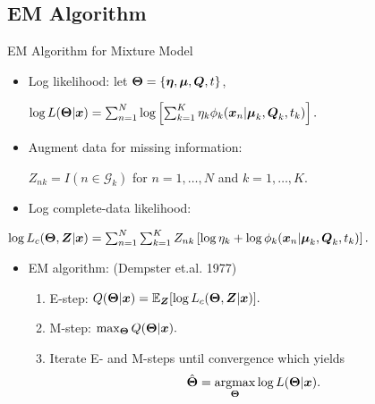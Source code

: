 \documentclass{beamer}
\begin{document}

\subsection{EM Algorithm}

\begin{frame}{EM Algorithm for Mixture Model}

\begin{itemize}
\item Log likelihood:
let $\boldsymbol{\Theta} = \{\boldsymbol{\eta}, \boldsymbol{\mu}, \boldsymbol{Q}, t\}$,
\begin{center}
$
\log L(\boldsymbol{\Theta} | \boldsymbol{x})
 = \sum_{n=1}^N \log \left[
   \sum_{k = 1}^K \eta_k \phi_k(\boldsymbol{x}_n| \boldsymbol{\mu}_k, \boldsymbol{Q}_k, t_k)
   \right ].
$
\end{center}


\item Augment data for missing information:
\begin{center}
$Z_{nk} = I(n \in \mathcal{G}_k)$
for $n = 1, \ldots, N$ and $k = 1, \ldots, K$.
\end{center}


\item Log complete-data likelihood:
\end{itemize}
\begin{center}
$
\log L_c(\boldsymbol{\Theta}, \boldsymbol{Z} | \boldsymbol{x}) =
\sum_{n = 1}^N
\sum_{k=1}^K
Z_{nk}
\left[ \log \eta_k + \log \phi_k(\boldsymbol{x}_n| \boldsymbol{\mu}_k, \boldsymbol{Q}_k, t_k)
\right].
$
\end{center}

\begin{itemize}
\item EM algorithm:  (Dempster et.al. 1977)

\begin{enumerate}
\item E-step:
$
Q(\boldsymbol{\Theta} | \boldsymbol{x}) =
\mathbb{E}_{\boldsymbol{Z}} [\log L_c(\boldsymbol{\Theta},\boldsymbol{Z} | \boldsymbol{x})].
$

\item M-step:
$
\max_{\boldsymbol{\Theta}} Q(\boldsymbol{\Theta} | \boldsymbol{x}).
$

\item Iterate E- and M-steps until convergence which yields
$$
\hat{\vect{\Theta}} = \argmax_{\vect{\Theta}} \log L(\vect{\Theta} | \vect{x}).
$$
\end{enumerate}

\end{itemize}
\end{frame}
\end{document}
